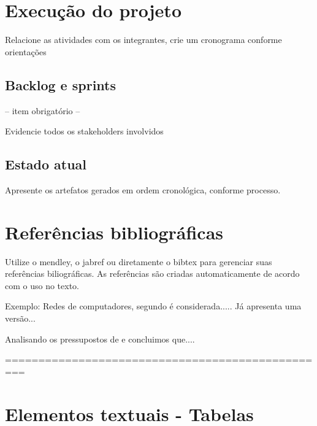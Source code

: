 \documentclass[	DIV=calc,%
							paper=a4,%
							fontsize=12pt,%
							onecolumn]{scrartcl}	 					%
\begin{document}
\section{Execução do projeto}

Relacione as atividades com os integrantes, crie um cronograma conforme orientações
\subsection{Backlog e sprints}
-- item obrigatório --

Evidencie todos os stakeholders involvidos


\subsection{Estado atual}
Apresente os artefatos gerados em ordem cronológica, conforme processo.


\section{Referências bibliográficas}
Utilize o mendley, o jabref ou diretamente o bibtex para gerenciar suas referências biliográficas. As referências são criadas automaticamente de acordo com o uso no texto.

Exemplo: Redes de computadores, segundo \cite{t2013} é considerada..... Já \cite{kurose2010} apresenta uma versão...

Analisando os pressupostos de \cite{ref3} e \cite{ref4} concluimos que....


\renewcommand\refname{} %

  

=================================================
\section{Elementos textuais - Tabelas}

\end{document}
